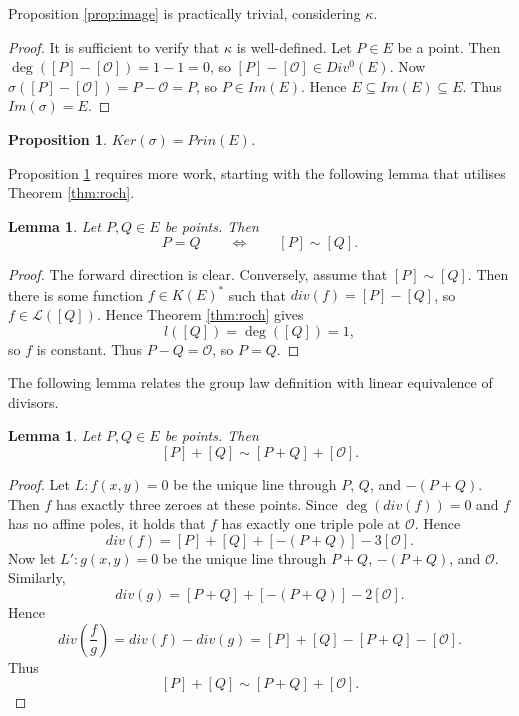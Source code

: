 \documentclass{article}
\theoremstyle{plain}
\newtheorem{lemma}[n]{Lemma}
\newtheorem{proposition}[n]{Proposition}
\theoremstyle{definition}
\newcommand{\rb}[1]{\left( #1 \right)}
\renewcommand{\sb}[1]{\left[ #1 \right]}
\newcommand{\LL}{\mathcal{L}}
\newcommand{\OO}{\mathcal{O}}
\begin{document}
Proposition \ref{prop:image} is practically trivial, considering $ \kappa $.

\begin{proof}
It is sufficient to verify that $ \kappa $ is well-defined. Let $ P \in E $ be a point. Then $ \deg\rb{\sb{P} - \sb{\OO}} = 1 - 1 = 0 $, so $ \sb{P} - \sb{\OO} \in Div^0\rb{E} $. Now $ \sigma\rb{\sb{P} - \sb{\OO}} = P - \OO = P $, so $ P \in Im\rb{E} $. Hence $ E \subseteq Im\rb{E} \subseteq E $. Thus $ Im\rb{\sigma} = E $.
\end{proof}

\begin{proposition}
\label{prop:kernel}
$ Ker\rb{\sigma} = Prin\rb{E} $.
\end{proposition}

Proposition \ref{prop:kernel} requires more work, starting with the following lemma that utilises Theorem \ref{thm:roch}.

\begin{lemma}
Let $ P, Q \in E $ be points. Then
$$ P = Q \qquad \iff \qquad \sb{P} \sim \sb{Q}. $$
\end{lemma}

\begin{proof}
The forward direction is clear. Conversely, assume that $ \sb{P} \sim \sb{Q} $. Then there is some function $ f \in K\rb{E}^* $ such that $ div\rb{f} = \sb{P} - \sb{Q} $, so $ f \in \LL\rb{\sb{Q}} $. Hence Theorem \ref{thm:roch} gives
$$ l\rb{\sb{Q}} = \deg\rb{\sb{Q}} = 1, $$
so $ f $ is constant. Thus $ P - Q = \OO $, so $ P = Q $.
\end{proof}

The following lemma relates the group law definition with linear equivalence of divisors.

\begin{lemma}
Let $ P, Q \in E $ be points. Then
$$ \sb{P} + \sb{Q} \sim \sb{P + Q} + \sb{\OO}. $$
\end{lemma}

\begin{proof}
Let $ L : f\rb{x, y} = 0 $ be the unique line through $ P $, $ Q $, and $ -\rb{P + Q} $. Then $ f $ has exactly three zeroes at these points. Since $ \deg\rb{div\rb{f}} = 0 $ and $ f $ has no affine poles, it holds that $ f $ has exactly one triple pole at $ \OO $. Hence
$$ div\rb{f} = \sb{P} + \sb{Q} + \sb{-\rb{P + Q}} - 3\sb{\OO}. $$
Now let $ L' : g\rb{x, y} = 0 $ be the unique line through $ P + Q $, $ -\rb{P + Q} $, and $ \OO $. Similarly,
$$ div\rb{g} = \sb{P + Q} + \sb{-\rb{P + Q}} - 2\sb{\OO}. $$
Hence
$$ div\rb{\dfrac{f}{g}} = div\rb{f} - div\rb{g} = \sb{P} + \sb{Q} - \sb{P + Q} - \sb{\OO}. $$
Thus
$$ \sb{P} + \sb{Q} \sim \sb{P + Q} + \sb{\OO}. $$
\end{proof}
\end{document}
